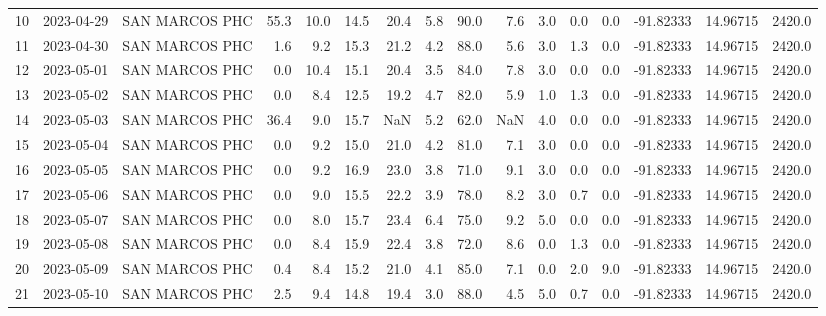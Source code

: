 \documentclass[12pt]{article}
\begin{document}
\begin{center}
\begin{tabular}{lllrrrrrrrrrrrrr}
10  & 2023-04-29 &  SAN MARCOS PHC &    55.3 &  10.0 &   14.5 &  20.4 &      5.8 &     90.0 &        7.6 &  3.0 &         0.0 &         0.0 & -91.82333 &  14.96715 &   2420.0 \\
11  & 2023-04-30 &  SAN MARCOS PHC &     1.6 &   9.2 &   15.3 &  21.2 &      4.2 &     88.0 &        5.6 &  3.0 &         1.3 &         0.0 & -91.82333 &  14.96715 &   2420.0 \\
12  & 2023-05-01 &  SAN MARCOS PHC &     0.0 &  10.4 &   15.1 &  20.4 &      3.5 &     84.0 &        7.8 &  3.0 &         0.0 &         0.0 & -91.82333 &  14.96715 &   2420.0 \\
13  & 2023-05-02 &  SAN MARCOS PHC &     0.0 &   8.4 &   12.5 &  19.2 &      4.7 &     82.0 &        5.9 &  1.0 &         1.3 &         0.0 & -91.82333 &  14.96715 &   2420.0 \\
14  & 2023-05-03 &  SAN MARCOS PHC &    36.4 &   9.0 &   15.7 &   NaN &      5.2 &     62.0 &        NaN &  4.0 &         0.0 &         0.0 & -91.82333 &  14.96715 &   2420.0 \\
15  & 2023-05-04 &  SAN MARCOS PHC &     0.0 &   9.2 &   15.0 &  21.0 &      4.2 &     81.0 &        7.1 &  3.0 &         0.0 &         0.0 & -91.82333 &  14.96715 &   2420.0 \\
16  & 2023-05-05 &  SAN MARCOS PHC &     0.0 &   9.2 &   16.9 &  23.0 &      3.8 &     71.0 &        9.1 &  3.0 &         0.0 &         0.0 & -91.82333 &  14.96715 &   2420.0 \\
17  & 2023-05-06 &  SAN MARCOS PHC &     0.0 &   9.0 &   15.5 &  22.2 &      3.9 &     78.0 &        8.2 &  3.0 &         0.7 &         0.0 & -91.82333 &  14.96715 &   2420.0 \\
18  & 2023-05-07 &  SAN MARCOS PHC &     0.0 &   8.0 &   15.7 &  23.4 &      6.4 &     75.0 &        9.2 &  5.0 &         0.0 &         0.0 & -91.82333 &  14.96715 &   2420.0 \\
19  & 2023-05-08 &  SAN MARCOS PHC &     0.0 &   8.4 &   15.9 &  22.4 &      3.8 &     72.0 &        8.6 &  0.0 &         1.3 &         0.0 & -91.82333 &  14.96715 &   2420.0 \\
20  & 2023-05-09 &  SAN MARCOS PHC &     0.4 &   8.4 &   15.2 &  21.0 &      4.1 &     85.0 &        7.1 &  0.0 &         2.0 &         9.0 & -91.82333 &  14.96715 &   2420.0 \\
21  & 2023-05-10 &  SAN MARCOS PHC &     2.5 &   9.4 &   14.8 &  19.4 &      3.0 &     88.0 &        4.5 &  5.0 &         0.7 &         0.0 & -91.82333 &  14.96715 &   2420.0 \\

\end{tabular}
\end{center}
\end{document}
